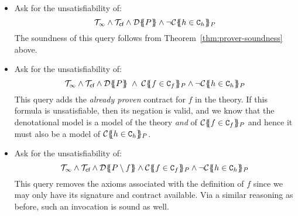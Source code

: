 \begin{itemize}
  \item Ask for the unsatisfiability of: 
    \[  \Th_\infty \land \Th_\lcfZ \land \dtrans{}{P} \land \neg\ctrans{\Sigma}{P}{h \in \Ct_h} \]
        The soundness of this query follows from Theorem~\ref{thm:prover-soundness} above.

  \item Ask for the unsatisfiability of:
    \[  \Th_\infty \land \Th_\lcfZ \land 
        \dtrans{\Sigma}{P}\;\land\;\ctrans{\Sigma}{P}{f \in \Ct_f} \land \neg \ctrans{\Sigma}{P}{h \in \Ct_h} \]
        This query adds the {\em already proven} contract for $f$ in the theory. If this formula
        is unsatisfiable, then its negation is valid, and we know that the denotational model is 
        a model of the theory {\em and} of $\ctrans{\Sigma}{P}{f \in \Ct_f}$ and hence it must also
        be a model of $\ctrans{\Sigma}{P}{h \in \Ct_h}$.
  \item Ask for the unsatisfiability of:
    \[  \Th_\infty \land \Th_\lcfZ \land 
        \dtrans{\Sigma}{P \setminus f}\land\ctrans{\Sigma}{P}{f \in \Ct_f}\land
        \neg\ctrans{\Sigma}{P}{h \in \Ct_h} \]
        This query removes the axioms associated with the definition of $f$ since we may only have 
        its signature and contract available. Via a similar reasoning as before, such an invocation 
        is sound as well.
\end{itemize}




